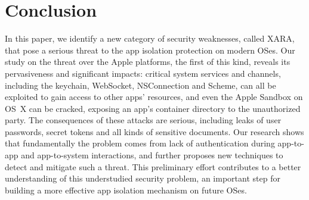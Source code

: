 \documentclass{article}
\begin{document}
\section{Conclusion}
\label{sec:conclude}
In this paper, we identify a new category of security weaknesses, called XARA, that pose a serious threat to the app isolation protection on modern OSes. Our study on the threat over the Apple platforms, the first of this kind, reveals its pervasiveness and significant impacts: critical system services and channels, including the keychain, WebSocket, NSConnection and Scheme, can all be exploited to gain access to other apps' resources, and even the Apple Sandbox on OS~X can be cracked, exposing an app's container directory to the unauthorized party. The consequences of these attacks are serious, including leaks of user passwords, secret tokens and all kinds of sensitive documents. Our research shows that fundamentally the problem comes from lack of authentication during app-to-app and app-to-system interactions, and further proposes new techniques to detect and mitigate such a threat. This preliminary effort contributes to a better understanding of this understudied security problem, an important step for building a more effective app isolation mechanism on future OSes.
\end{document}

